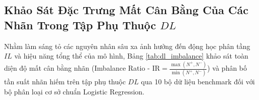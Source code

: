 \documentclass[10pt,a4paper,twoside]{article}
\begin{document}
\clearpage
\subsection{Khảo Sát Đặc Trưng Mất Cân Bằng Của Các Nhãn Trong Tập Phụ Thuộc $DL$}
Nhằm làm sáng tỏ các nguyên nhân sâu xa ảnh hưởng đến động học phân tầng $IL$ và hiệu năng tổng thể của mô hình, Bảng \ref{tab:dl_imbalance} khảo sát toàn diện độ mất cân bằng nhãn (Imbalance Ratio - $\text{IR} = \frac{\max(N^+, N^-)}{\min(N^+, N^-)}$) và phân bố tần suất nhãn hiếm trên tập phụ thuộc $DL$ qua 10 bộ dữ liệu benchmark đối với bộ phân loại cơ sở chuẩn Logistic Regression.

\begin{table}[H]
\centering
\caption{Khảo sát đặc trưng mất cân bằng của các nhãn trong tập phụ thuộc $DL$ (Dependent Labels) ở phiên bản chuẩn (Logistic Regression). (*Chỉ số $\text{IR} = \frac{\max(N^+, N^-)}{\min(N^+, N^-)}$; nhãn hiếm định nghĩa là nhãn có tần suất xuất hiện $< 5\%$).}
\label{tab:dl_imbalance}
\end{table}
\end{document}
